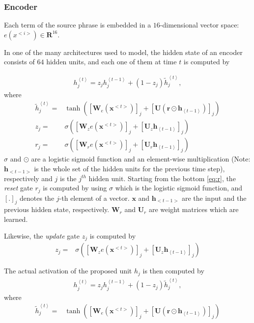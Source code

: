 \documentclass[a4paper]{article}
\newcommand{\qt}[1]{\left<#1\right>}
\newcommand{\vect}[1]{\mathbf{#1}}
\newcommand{\matr}[1]{\mathbf{#1}}
\newcommand{\vh}[0]{\vect{h}}
\newcommand{\vx}[0]{\vect{x}}
\newcommand{\mW}[0]{\matr{W}}
\newcommand{\mU}[0]{\matr{U}}
\begin{document}
\subsubsection*{Encoder}

Each term of the source phrase is embedded in a $16$-dimensional vector space:
$e(x^{<i>}) \in \mathbf{R}^{16}$.

In one of the many architectures used to model,
the hidden state of an encoder consists of $64$ hidden units, and each one of them at time $t$ is computed by

\begin{align}
    h_j^{\qt{t}} = z_j h_j^{\qt{t-1}} + (1 - z_j) \tilde{h}_j^{\qt{t}},
\end{align}
where  
\begin{align}
    \tilde{h}_j^{\qt{t}} =& \tanh\left( \left[ \textbf{W}_e(\textbf{x}^{<t>}) \right]_j + \left[\textbf{U} \left(\textbf{r}\odot \textbf{h}_{\qt{t-1}}\right) \right]_j \right)
    \\
    z_j =& \sigma\left( \left[\textbf{W}_z e(\textbf{x}^{<t>}) \right]_j + \left[\textbf{U}_{z} \textbf{h}_{\qt{t-1}}\right]_j \right)
    \\
    \label{eq:r}
    r_j =& \sigma\left( \left[ \textbf{W}_r e(\textbf{x}^{<t>}) \right]_j + 
    \left[\textbf{U}_{r} \textbf{h}_{\qt{t-1}}\right]_j \right)
\end{align}
$\sigma$ and $\odot$ are a logistic sigmoid function and an element-wise
multiplication (Note: $\vh_{<t-1>}$ is the whole set of the hidden units for the previous time step), respectively and $j$ is the $j^{th}$ hidden unit.
 Starting from the bottom \ref{eq:r}, the
\textit{reset} gate $r_j$ is computed by using $\sigma$ which is the logistic sigmoid function, and $\left[ . \right]_j$ denotes
the $j$-th element of a vector. $\vx$ and $\vh_{<t-1>}$ are the input and the
previous hidden state, respectively. $\mW_r$ and $\mU_r$ are weight matrices
which are learned.

Likewise, the \textit{update} gate $z_j$ is computed by
\begin{align*}
    \label{eq:update}
    z_j =& \sigma\left( \left[\textbf{W}_z e(\textbf{x}^{<t>}) \right]_j + \left[\textbf{U}_{z} \textbf{h}_{\qt{t-1}}\right]_j \right)
\end{align*}

The actual activation of the proposed unit $h_j$ is then computed by
\begin{align*}
    \label{eq:activation}
    h_j^{\qt{t}} = z_j h_j^{\qt{t-1}} + (1 - z_j) \tilde{h}_j^{\qt{t}},
\end{align*}
where
\begin{align*}
\label{eq:same_temp_hidden}
\tilde{h}_j^{\qt{t}} =& \tanh\left( \left[ \textbf{W}_e(\textbf{x}^{<t>}) \right]_j + \left[\textbf{U} \left(\textbf{r}\odot \textbf{h}_{\qt{t-1}}\right) \right]_j \right)
\end{align*}
\end{document}
